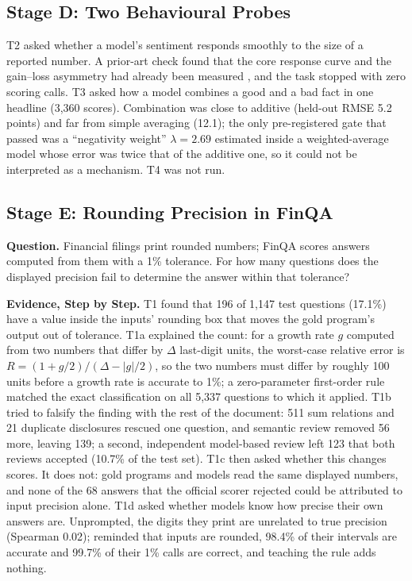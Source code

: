 \documentclass[11pt]{article}
\begin{document}
\subsection{Stage D: Two Behavioural Probes}

T2 asked whether a model's sentiment responds smoothly to the size of a reported number. A prior-art check found that the core response curve and the gain--loss asymmetry had already been measured \citep{marks2026psychophysics}, and the task stopped with zero scoring calls. T3 asked how a model combines a good and a bad fact in one headline (3,360 scores). Combination was close to additive (held-out RMSE 5.2 points) and far from simple averaging (12.1); the only pre-registered gate that passed was a ``negativity weight'' $\lambda=2.69$ estimated inside a weighted-average model whose error was twice that of the additive one, so it could not be interpreted as a mechanism. T4 was not run.

\subsection{Stage E: Rounding Precision in FinQA}

\textbf{Question.} Financial filings print rounded numbers; FinQA \citep{chen-etal-2021-finqa} scores answers computed from them with a 1\% tolerance. For how many questions does the displayed precision fail to determine the answer within that tolerance?

\textbf{Evidence, Step by Step.} T1 found that 196 of 1,147 test questions (17.1\%) have a value inside the inputs' rounding box that moves the gold program's output out of tolerance. T1a explained the count: for a growth rate $g$ computed from two numbers that differ by $\Delta$ last-digit units, the worst-case relative error is $R=(1+g/2)/(\Delta-|g|/2)$, so the two numbers must differ by roughly 100 units before a growth rate is accurate to 1\%; a zero-parameter first-order rule matched the exact classification on all 5,337 questions to which it applied. T1b tried to falsify the finding with the rest of the document: 511 sum relations and 21 duplicate disclosures rescued one question, and semantic review removed 56 more, leaving 139; a second, independent model-based review left 123 that both reviews accepted (10.7\% of the test set). T1c then asked whether this changes scores. It does not: gold programs and models read the same displayed numbers, and none of the 68 answers that the official scorer rejected could be attributed to input precision alone. T1d asked whether models know how precise their own answers are. Unprompted, the digits they print are unrelated to true precision (Spearman 0.02); reminded that inputs are rounded, 98.4\% of their intervals are accurate and 99.7\% of their 1\% calls are correct, and teaching the rule adds nothing.
\end{document}
